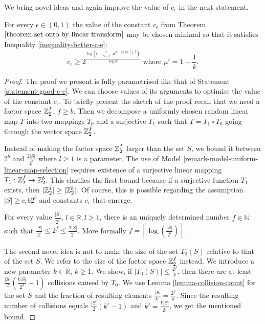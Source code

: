 We bring novel ideas and again improve the value of $c_\epsilon$ in the next statement.
\begin{statement}
\label{statement-better-c-e}
For every $\epsilon \in (0, 1)$ the value of the constant $c_\epsilon$ from Theorem $\ref{theorem-set-onto-by-linear-transform}$ may be chosen minimal so that it satisfies Inequality \ref{inequality-better-c-e}:
\begin{equation}
\label{inequality-better-c-e}
c_\epsilon \geq 2 ^ {\frac{\log \left({\epsilon - \frac{2^l}{2^l k - 2}}\cdot{{\mu'} ^ {l - \log \log \left( \frac{1}{\mu'} \right)}}\right)}{\log {\mu'}}} \text{ where $\mu' = 1 - \frac{1}{k}$.}
\end{equation}
\end{statement}
\begin{proof}
The proof we present is fully parametrised like that of Statement \ref{statement-good-c-e}. We can choose values of its arguments to optimise the value of the constant $c_\epsilon$. To briefly present the sketch of the proof recall that we need a factor space $\mathbb{Z}_{2}^{f}$, $f \geq b$. Then we decompose a uniformly chosen random linear map $T$ into two mappings $T_0$ and a surjective $T_1$ such that $T = T_1 \circ T_0$ going through the vector space $\mathbb{Z}_{2}^{f}$.

Instead of making the factor space $\mathbb{Z}_{2}^{f}$ larger than the set $S$, we bound it between $2 ^ b$ and $\frac{2|S|}{2 ^ l}$ where $l \geq 1$ is a parameter. The use of Model \ref{remark-model-uniform-linear-map-selection} requires existence of a surjective linear mapping $T_1: \mathbb{Z}_{2}^{f} \rightarrow \mathbb{Z}_{2}^{b}$. This clarifies the first bound because if a surjective function $T_1$ exists, then $|\mathbb{Z}_{2}^{f}| \geq |\mathbb{Z}_{2}^{b}|$. Of course, this is possible regarding the assumption $|S| \geq c_\epsilon b 2 ^ b$ and constants $c_\epsilon$ that emerge.

For every value $\frac{|S|}{2^l}$, $l \in \mathbb{R}, l \geq 1$, there is an uniquely determined number $f \in \mathbb{N}$ such that $\frac{|S|}{2 ^ l} \leq 2 ^ f \leq \frac{2|S|}{2 ^ l}$. More formally $f = \left\lceil \log \left( \frac{|S|}{2 ^ l} \right) \right\rceil$. 

The second novel idea is not to make the size of the set $T_0(S)$ relative to that of the set $S$. We refer to the size of the factor space $\mathbb{Z}_{2}^{f}$ instead. We introduce a new parameter $k \in \mathbb{R}$, $k \geq 1$. We show, if $|T_0(S)| \leq \frac{2 ^ f}{k}$, then there are at least $\frac{|S|}{2}\left(\frac{k|S|}{2 ^ f} - 1\right)$ collisions caused by $T_0$. We use Lemma \ref{lemma-collision-count} for the set $S$ and the fraction of resulting elements $\frac{|S|}{k'} = \frac{2 ^ f}{k}$. Since the resulting number of collisions equals $\frac{|S|}{2}(k' - 1)$ and $k' = \frac{k|S|}{2 ^ f}$, we get the mentioned bound.


\end{proof}
